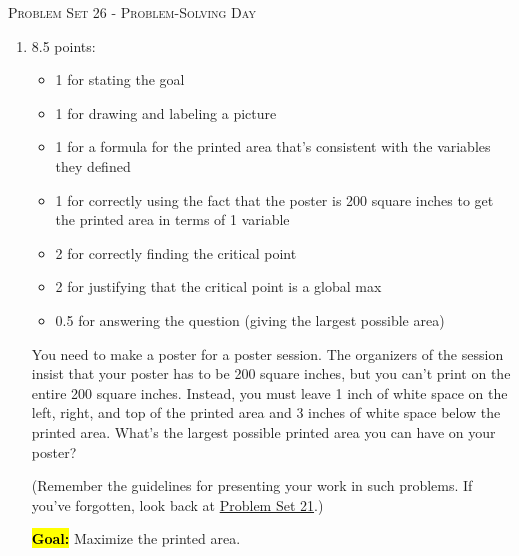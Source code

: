 \documentclass{article}
\newcommand{\highlight}[1]{\boldmath\hl{\textbf{#1}}\unboldmath}
\begin{document}
\begin{center}
  \large\textsc{Problem Set 26 - Problem-Solving Day}
\end{center}

\begin{enumerate}
\item  \begin{grading}
    8.5 points:
    \begin{itemize}[nosep]
    \item 1 for stating the goal
    \item 1 for drawing and labeling a picture
    \item 1 for a formula for the printed area that's consistent with the variables they defined
    \item 1 for correctly using the fact that the poster is 200 square inches to get the printed area in terms of 1 variable
    \item 2 for correctly finding the critical point
    \item 2 for justifying that the critical point is a global max
    \item 0.5 for answering the question (giving the largest possible area)
    \end{itemize}
  \end{grading}

  \begin{problem}[\newpage]
    You need to make a poster for a poster session. The organizers of the session insist that your poster has to be 200 square inches, but you can't print on the entire 200 square inches. Instead, you must leave 1 inch of white space on the left, right, and top of the printed area and 3 inches of white space below the printed area. What's the largest possible printed area you can have on your poster?

    (Remember the guidelines for presenting your work in such problems. If you've forgotten, look back at \href{https://people.math.harvard.edu/~jjchen/mathma/docs/homework/PS21.html}{Problem Set 21}.)
  \end{problem}

  \begin{solution}
    \highlight{Goal:} Maximize the printed area. 


\end{solution}
\end{enumerate}
\end{document}
